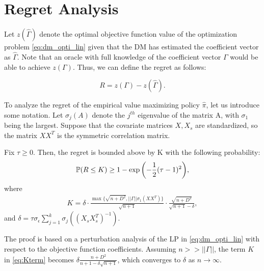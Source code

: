 \documentclass[11pt,a4paper]{article}
\begin{document}

\iffalse
or, we can write: %

$$Max_{\hat \pi, y_i}: E \left( \left(\hat \Gamma^T X Diag(A \mathbf{1}_{N} ) ^{-1} A \right) \hat \pi  - \sum_{i \leq N} y_i \right)$$ subject to: 

$$\forall i,  \left( Diag(A \mathbf{1}_{N} ) ^{-1} A \hat \pi \right)_i \leq y_i$$

$$\forall i, y_i, \hat \pi_i \in \{0,1\} $$
\fi

\section{Regret Analysis}
Let $z(\hat \Gamma)$ denote the optimal objective function value of the optimization problem \eqref{eq:dm_opti_lin} given that the DM has estimated the coefficient vector as $\hat{\Gamma} $. Note that an oracle with full knowledge of the coefficient vector $\Gamma$ would be able to achieve $z(\Gamma)$. Thus, we can define the regret as follows:

$$R = z(\Gamma) - z(\hat{\Gamma}) .$$

To analyze the regret of the empirical value maximizing policy $\hat \pi$, let us introduce some notation. Let $\sigma_j( A)$ denote the $j^{th}$ eigenvalue of the matrix A, with $\sigma_1$ being the largest. Suppose that the covariate matrices $X, X_s$ are standardized, so the matrix $X X^T$ is the symmetric correlation matrix. 
\begin{thm}
Fix $\tau \geq 0$. Then, the regret is bounded above by K with the following probability:
\begin{align}
\mathbb{P}(R \leq K) \geq 1 - \exp{\left( -\frac{1}{2} (\tau -1 )^2 \right)},
\end{align}
where
\begin{align}\label{eq:Kterm}
K = \delta \cdot \frac{ \max \{\sqrt{n+D^2}, || \Gamma || \sigma_{1} (X X^T) \} }{ \sqrt{n+1} } \cdot \frac{ \sqrt{n+D^2} }{\sqrt{n+1} - \delta },
\end{align}
and $\delta = \tau \sigma_\epsilon \sum_{j=1}^k \sigma_j( (X_s X_s^T)^{-1})$.
\end{thm}

The proof is based on a perturbation analysis of the LP in \eqref{eq:dm_opti_lin} with respect to the objective function coefficients. Assuming $n >> ||\Gamma||$, the term $K$ in \eqref{eq:Kterm} becomes $\delta \frac{n+D^2}{n+1 -  \delta \sqrt{n+1}}$, which converges to $\delta$ as $n \rightarrow \infty$.
\end{document}
